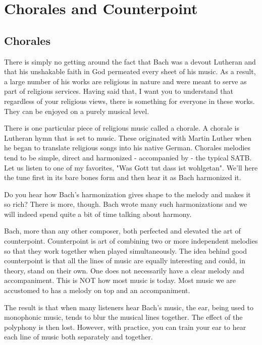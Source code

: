 \chapter{Chorales and Counterpoint}

\section{Chorales}
There is simply no getting around the fact that Bach was a devout Lutheran and that his unshakable faith in God permeated every sheet of his music. As a result, a large number of his works are religious in nature and were meant to serve as part of religious services. Having said that, I want you to understand that regardless of your religious views, there is something for everyone in these works. They can be enjoyed on a purely musical level. 

There is one particular piece of religious music called a chorale. A chorale is Lutheran hymn that is set to music. These originated with Martin Luther when he began to translate religious songs into his native German. Chorales melodies tend to be simple, direct and harmonized - accompanied by - the typical SATB. Let us listen to one of my favorites, "Was Gott tut dass ist wohlgetan". We'll here the tune first in its bare bones form and then hear it as Bach harmonized it.


Do you hear how Bach's harmonization gives shape to the melody and makes it so rich? There is more, though. Bach wrote many such harmonizations and we will indeed spend quite a bit of time talking about harmony. 

Bach, more than any other composer, both perfected and elevated the art of counterpoint. %
Counterpoint is art of combining two or more independent melodies so that they work together when played simultaneously. The idea behind good counterpoint is that all the lines of music are equally interesting and could, in theory, stand on their own. One does not necessarily have a clear melody and accompaniment. This is NOT how most music is today. Most music we are accustomed to has a melody on top and an accompaniment. %

The result is that when many listeners hear Bach's music, the ear, being used to monophonic music, tends to blur the musical lines together. The effect of the polyphony is then lost. However, with practice, you can train your ear to hear each line of music both separately and together.

